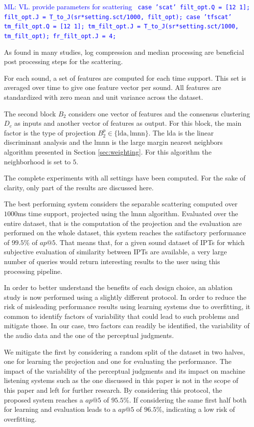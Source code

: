 \documentclass{bmcart}
\newcommand{\ipts}{IPTs\xspace}
\newcommand{\ml}[1]{\textcolor{blue}{ML: #1}}
\begin{document}
\ml{VL. provide parameters for scattering
\texttt{
case 'scat'
    filt\_opt.Q = [12 1];
    filt\_opt.J = T\_to\_J(sr*setting.sct/1000, filt\_opt);
case 'tfscat'
    tm\_filt\_opt.Q = [12 1];
    tm\_filt\_opt.J = T\_to\_J(sr*setting.sct/1000, tm\_filt\_opt);
    fr\_filt\_opt.J = 4;}}

As found in many studies, log compression and median processing are beneficial post processing steps for the scattering.

For each sound, a set of features are computed for each time support. This set is averaged over time to give one feature vector per sound.
All features are standardized with zero mean and unit variance across the dataset.

The second block $B_2$ considers one vector of features and the consensus clustering $D_c$ as inputs and another vector of features as output. For this block, the main factor is the type of projection $B_2^p \in \{ \text{lda}, \text{lmnn} \}$. The lda is the linear discriminant analysis \cite{} and the lmnn is the large margin nearest neighbors algorithm presented in Section \ref{sec:weighting}. For this algorithm the neighborhood is set to $5$.

The complete experiments with all settings have been computed. For the sake of clarity, only part of the results are discussed here.

The best performing system considers the separable scattering computed over $1000$ms time support, projected using the lmnn algorithm. Evaluated over the entire dataset, that is the computation of the projection and the evaluation are performed on the whole dataset, this system reaches the satifactory performance of $99.5\%$ of $ap@5$. That means that, for a given sound dataset of \ipts for which subjective evaluation of similarity between \ipts are available, a very large number of queries would return interesting results to the user using this processing pipeline.

In order to better understand the benefits of each design choice, an ablation study is now performed using a slightly different protocol. In order to reduce the risk of misleading performance results using learning systems due to overfitting, it common to identify factors of variability that could lead to such problems and mitigate those. In our case, two factors can readily be identified, the variability of the audio data and the one of the perceptual judgments.

We mitigate the first by considering a random split of the dataset in two halves, one for learning the projection and one for evaluating the performance. The impact of the variability of the perceptual judgments and its impact on machine listening systems such as the one discussed in this paper is not in the scope of this paper and left for further research. By considering this protocol, the proposed system reaches a $ap@5$ of $95.5\%$. If considering the same first half both for learning and evaluation leads to a $ap@5$ of $96.5\%$, indicating a low risk of overfitting.
\end{document}
